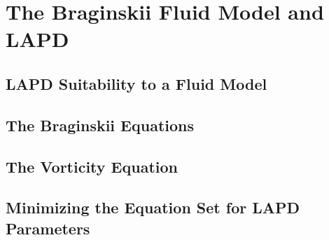 \chapter{The Braginskii Fluid Model and LAPD}

\section{LAPD Suitability to a Fluid Model}

\section{The Braginskii Equations}

\section{The Vorticity Equation}

\section{Minimizing the Equation Set for LAPD Parameters}
